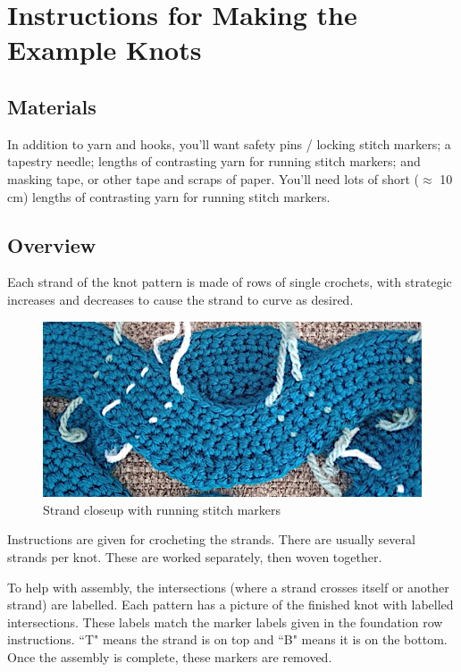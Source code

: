 \documentclass[openany]{book}
\begin{document}
\chapter{Instructions for Making the Example Knots}\label{sec:examples}
\section{Materials}

In addition to yarn and hooks, you'll want safety pins / locking stitch markers; a tapestry needle; lengths of contrasting yarn for running stitch markers; and masking tape, or other tape and scraps of paper. 
You'll need lots of short ($\approx$ 10 cm) lengths of contrasting yarn for running stitch markers. 

\section{Overview}

Each strand of the knot pattern is made of rows of single crochets, with strategic increases and decreases to cause the strand to curve as desired.

\begin{figure}[H]\centering
\includegraphics[width=.75\textwidth]{pic/closeup}
\caption{Strand closeup with running stitch markers}
\end{figure}

Instructions are given for crocheting the strands. There are usually several strands per knot. These are worked separately, then woven together. 


To help with assembly, the intersections (where a strand crosses itself or another strand) are labelled. Each pattern has a picture of the finished knot with labelled intersections. These labels match the marker labels given in the foundation row instructions. ``T" means the strand is on top and ``B" means it is on the bottom. Once the assembly is complete, these markers are removed.
\end{document}
